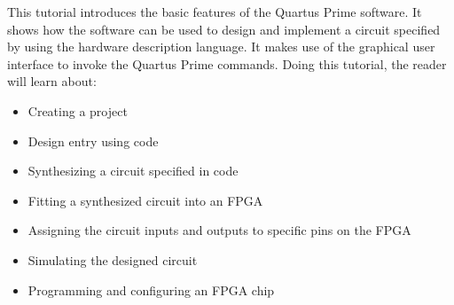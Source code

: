 \noindent
This tutorial introduces the basic features of the Quartus Prime software. 
It shows how the software can be used to design and implement a circuit specified by
using the \typeName{} hardware description language.
It makes use of the graphical user interface to invoke the Quartus Prime commands.
Doing this tutorial, the reader will learn about:
\begin{itemize}
\item Creating a project
\item Design entry using \typeName{} code
\item Synthesizing a circuit specified in \typeName{} code
\item Fitting a synthesized circuit into an FPGA
\item Assigning the circuit inputs and outputs to specific pins on the FPGA
\item Simulating the designed circuit
\item Programming and configuring an FPGA chip
\end{itemize}
